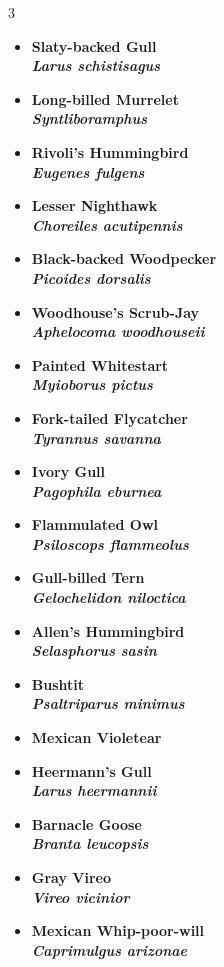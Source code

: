 \documentclass[10pt,letterpaper]{article}
\begin{document}
	\begin{multicols}{3}
		
	\begin{itemize}
		\item \textbf{Slaty-backed Gull \\ \textit{Larus schistisagus}}
		\item \textbf{Long-billed Murrelet \\ \textit{Syntliboramphus }}
		\item \textbf{Rivoli’s Hummingbird \\ \textit{Eugenes fulgens}}
		\item \textbf{Lesser Nighthawk \\ \textit{Choreiles acutipennis}}
		\item \textbf{Black-backed Woodpecker \\ \textit{Picoides dorsalis}}
		\item \textbf{Woodhouse’s Scrub-Jay \\ \textit{Aphelocoma woodhouseii}}
		\item \textbf{Painted Whitestart \\ \textit{Myioborus pictus}}
		\item \textbf{Fork-tailed Flycatcher \\ \textit{Tyrannus savanna}}
		\item \textbf{Ivory Gull \\ \textit{Pagophila eburnea}}
		\item \textbf{Flammulated Owl \\ \textit{Psiloscops flammeolus}}
		\item \textbf{Gull-billed Tern \\ \textit{Gelochelidon niloctica}}
		\item \textbf{Allen’s Hummingbird \\ \textit{Selasphorus sasin}}
		\item \textbf{Bushtit \\ \textit{Psaltriparus minimus}}
		\item \textbf{Mexican Violetear}
		\item \textbf{Heermann’s Gull \\ \textit{Larus heermannii}}
		\item \textbf{Barnacle Goose \\ \textit{Branta leucopsis}}
		\item \textbf{Gray Vireo \\ \textit{Vireo vicinior}}
		\item \textbf{Mexican Whip-poor-will \\ \textit{Caprimulgus arizonae}}

\end{itemize}
\end{multicols}
\end{document}
